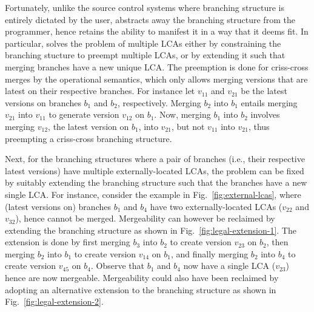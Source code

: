 Fortunately, unlike the source control systems where branching
structure is entirely dictated by the user, \name abstracts away the
branching structure from the programmer, hence retains the ability to
manifest it in a way that it deems fit. In particular, \name solves
the problem of multiple LCAs either by constraining the branching
stucture to preempt multiple LCAs, or by extending it such that
merging branches have a new unique LCA. The preemption is done for
criss-cross merges by the operational semantics, which only allows
merging versions that are latest on their respective branches. For
instance let $v_{11}$ and $v_{21}$ be the latest versions on branches
$b_1$ and $b_2$, respectively. Merging $b_2$ into $b_1$ entails
merging $v_{21}$ into $v_{11}$ to generate version $v_{12}$ on $b_1$.
Now, merging $b_1$ into $b_2$ involves merging $v_{12}$, the latest
version on $b_1$, into $v_{21}$, but not $v_{11}$ into $v_{21}$, thus
preempting a criss-cross branching structure. 

Next, for the branching structures where a pair of branches (i.e.,
their respective latest versions) have multiple externally-located
LCAs, the problem can be fixed by suitably extending the branching
structure such that the branches have a new single LCA. For instance,
consider the example in Fig.~\ref{fig:external-lcas}, where (latest
versions on) branches $b_1$ and $b_4$ have two externally-located LCAs
($v_{22}$ and $v_{32}$), hence cannot be merged. Mergeability can
however be reclaimed by extending the branching structure as shown in
Fig.~\ref{fig:legal-extension-1}. The extension is done by first merging
$b_3$ into $b_2$ to create version $v_{23}$ on $b_2$, then merging
$b_2$ into $b_1$ to create version $v_{14}$ on $b_1$, and finally
merging $b_2$ into $b_4$ to create version $v_{45}$ on $b_4$. Observe
that $b_1$ and $b_4$ now have a single LCA ($v_{23}$) hence are now
mergeable. Mergeability could also have been reclaimed by adopting an
alternative extension to the branching structure as shown in
Fig.~\ref{fig:legal-extension-2}.


